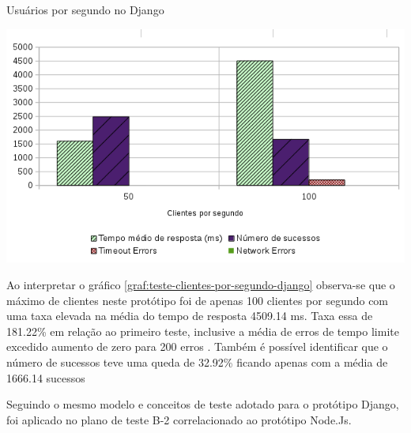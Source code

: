   \begin{grafico}[H]
    \setlength{\abovecaptionskip}{5pt}
    \setlength{\belowcaptionskip}{0pt}

    \caption[Usuários por segundo no Django]
	    {Usuários por segundo no Django}
    \centering
    \includegraphics[width=.80\textwidth]{imagem/graficos/grafico_django_plano_de_teste_2.png}
    \captionsetup[grafico]{justification=centering}
    \label{graf:teste-clientes-por-segundo-django}
  \end{grafico}

  Ao interpretar o gráfico \ref{graf:teste-clientes-por-segundo-django}  observa-se que o máximo de clientes neste protótipo
  foi de apenas 100 clientes por segundo com uma taxa elevada na média do tempo de resposta 4509.14 ms. Taxa essa de 181.22\%
  em relação ao primeiro teste, inclusive a média de erros de tempo limite excedido aumento de zero para 200 erros .
  Também é possível identificar que o número de sucessos teve uma queda de 32.92\% ficando apenas
  com a média de 1666.14 sucessos

  Seguindo o mesmo modelo e conceitos de teste adotado para o protótipo Django, foi aplicado no plano de teste
  B-2 correlacionado ao protótipo Node.Js.

